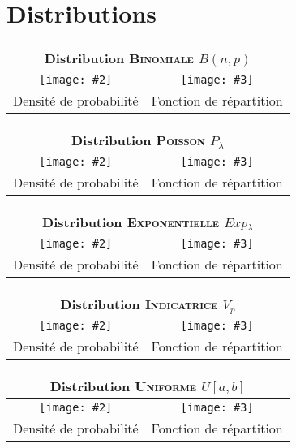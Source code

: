 \section{Distributions}


\newcommand{\createTabularLoi}[3]{
\begin{tabular}{|c|c|}

    \hline
    \multicolumn{2}{|c|}{\textbf{Distribution \textsc{#1}}}\\
    \hline
    \texttt{[image: \#2]}&\texttt{[image: \#3]}\\
    Densité de probabilité & Fonction de répartition\\
    \hline

\end{tabular}}

\begin{center}
    
    \createTabularLoi{Binomiale $B(n,p)$}{1.distributions/binomial_probability_density_function.pdf}{1.distributions/binomial_cumulative_distribution_function.pdf}
    
    \createTabularLoi{Poisson $P_\lambda$}{1.distributions/poisson_probability_density_function.pdf}{1.distributions/poisson_cumulative_distribution_function.pdf}
    
    \createTabularLoi{Exponentielle $Exp_\lambda$}{1.distributions/exponential_probability_density_function.pdf}{1.distributions/exponential_cumulative_distribution_function.pdf}
    
    \createTabularLoi{Indicatrice $V_p$}{1.distributions/indicatrice_probability_density_function.pdf}{1.distributions/indicatrice_cumulative_distribution_function.pdf}
    
    \createTabularLoi{Uniforme $U[a,b]$}{1.distributions/uniform_probability_density_function.pdf}{1.distributions/uniform_cumulative_distribution_function.pdf}


\end{center}
